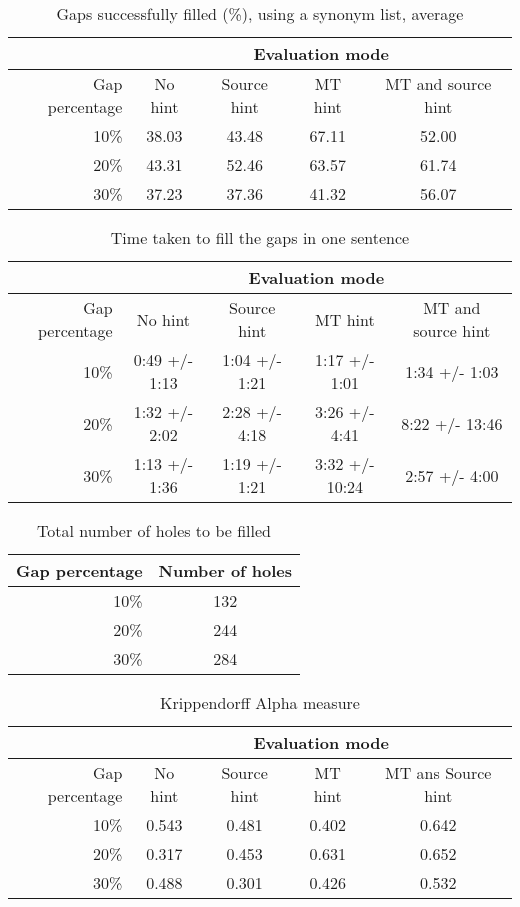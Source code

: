 \documentclass[11pt, oneside]{article}   	%
\begin{document}
\begin{table}[H]
\centering
\begin{tabular}{|r |*{4}{c}|}
\hline
 &\multicolumn{4}{c|}{Evaluation mode}\\
\hline
Gap percentage & No hint & Source hint & MT hint & MT and source hint\\
\hline
10\%&38.03&43.48&67.11&52.00\\
20\%&43.31&52.46&63.57&61.74\\
30\%&37.23&37.36&41.32&56.07\\
\hline
\end{tabular}
\caption {Gaps successfully filled (\%), using a synonym list, average} \label{tab:title} 
\end{table}

\begin{table}[H]
\centering
\begin{tabular}{|r |*{4}{c}|}
\hline
 &\multicolumn{4}{c|}{Evaluation mode}\\
\hline
Gap percentage & No hint & Source hint & MT hint & MT and source hint\\
\hline
10\%&0:49 +/- 1:13&1:04 +/- 1:21&1:17 +/- 1:01&1:34 +/- 1:03\\
20\%&1:32 +/- 2:02&2:28 +/- 4:18&3:26 +/- 4:41&8:22 +/- 13:46\\
30\%&1:13 +/- 1:36&1:19 +/- 1:21&3:32 +/- 10:24&2:57 +/- 4:00\\
\hline
\end{tabular}
\caption {Time taken to fill the gaps in one sentence} \label{tab:title} 
\end{table}

\begin{table}[H]
\centering
\begin{tabular}{|r |*{1}{c}|}
\hline
Gap percentage & Number of holes\\
\hline
10\%&132\\
20\%&244\\
30\%&284\\
\hline
\end{tabular}
\caption {Total number of holes to be filled} \label{tab:title}
\end{table}

\begin{table}[H]
\centering
\begin{tabular}{|r |*{4}{c}|}
\hline
 &\multicolumn{4}{c|}{Evaluation mode}\\
\hline
Gap percentage & No hint & Source hint & MT hint & MT ans Source hint\\
\hline
10\%&0.543 &0.481 &0.402 &0.642\\
20\%&0.317 &0.453 &0.631 &0.652\\
30\%&0.488 &0.301 &0.426 &0.532\\
\hline
\end{tabular}
\caption {Krippendorff Alpha measure} \label{tab:title}
\end{table}
\end{document}
